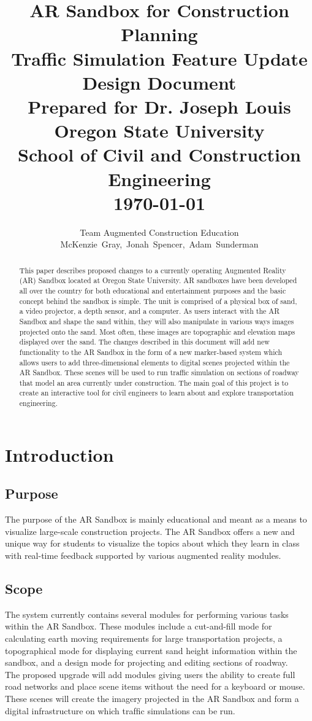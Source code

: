 \documentclass[letterpaper, 10pt, onecolumn, draftclsnofoot]{IEEEtran}
\title{\Large{\textbf{AR Sandbox for Construction Planning \\
                      Traffic Simulation Feature Update \\ 
                      \large{Design Document}}} \\
                      \vspace{15pt}
                      \small{Prepared for Dr. Joseph Louis \\
                      Oregon State University \\
                      School of Civil and Construction Engineering}\\
                      \today}
\author{Team Augmented Construction Education \\
       McKenzie~Gray,~Jonah~Spencer,~Adam~Sunderman}
\begin{document}
\maketitle
\vspace{100pt}

\begin{abstract}
    This paper describes proposed changes to a currently operating Augmented Reality (AR) Sandbox located at Oregon State University. AR sandboxes have been developed all over the country for both educational and entertainment purposes and the basic concept behind the sandbox is simple. The unit is comprised of a physical box of sand, a video projector, a depth sensor, and a computer. As users interact with the AR Sandbox and shape the sand within, they will also manipulate in various ways images projected onto the sand. Most often, these images are topographic and elevation maps displayed over the sand. The changes described in this document will add new functionality to the AR Sandbox in the form of a new marker-based system which allows users to add three-dimensional elements to digital scenes projected within the AR Sandbox. These scenes will be used to run traffic simulation on sections of roadway that model an area currently under construction. The main goal of this project is to create an interactive tool for civil engineers to learn about and explore transportation engineering.  
\end{abstract}
\newpage
\tableofcontents
\clearpage
\newpage


\section{Introduction}
    \subsection{Purpose}
        The purpose of the AR Sandbox is mainly educational and meant as a means to visualize large-scale construction projects. The AR Sandbox offers a new and unique way for students to visualize the topics about which they learn in class with real-time feedback supported by various augmented reality modules.
        
    \subsection{Scope}
        The system currently contains several modules for performing various tasks within the AR Sandbox. These modules include a cut-and-fill mode for calculating earth moving requirements for large transportation projects, a topographical mode for displaying current sand height information within the sandbox, and a design mode for projecting and editing sections of roadway.\\
        The proposed upgrade will add modules giving users the ability to create full road networks and place scene items without the need for a keyboard or mouse. These scenes will create the imagery projected in the AR Sandbox and form a digital infrastructure on which trafﬁc simulations can be run.
        
\end{document}
